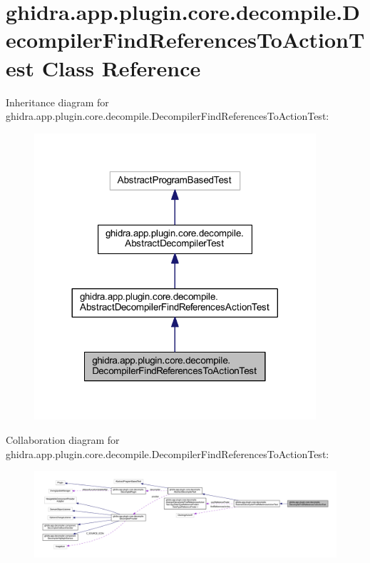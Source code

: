 \hypertarget{classghidra_1_1app_1_1plugin_1_1core_1_1decompile_1_1_decompiler_find_references_to_action_test}{}\section{ghidra.\+app.\+plugin.\+core.\+decompile.\+Decompiler\+Find\+References\+To\+Action\+Test Class Reference}
\label{classghidra_1_1app_1_1plugin_1_1core_1_1decompile_1_1_decompiler_find_references_to_action_test}


Inheritance diagram for ghidra.\+app.\+plugin.\+core.\+decompile.\+Decompiler\+Find\+References\+To\+Action\+Test\+:
\nopagebreak
\begin{figure}[H]
\begin{center}
\leavevmode
\includegraphics[width=296pt]{classghidra_1_1app_1_1plugin_1_1core_1_1decompile_1_1_decompiler_find_references_to_action_test__inherit__graph}
\end{center}
\end{figure}


Collaboration diagram for ghidra.\+app.\+plugin.\+core.\+decompile.\+Decompiler\+Find\+References\+To\+Action\+Test\+:
\nopagebreak
\begin{figure}[H]
\begin{center}
\leavevmode
\includegraphics[width=350pt]{classghidra_1_1app_1_1plugin_1_1core_1_1decompile_1_1_decompiler_find_references_to_action_test__coll__graph}
\end{center}
\end{figure}
